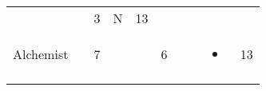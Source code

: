 \documentclass[12pt]{article}
\begin{document}
\begin{longtable}[]{@{}llllllllll@{}}
\begin{minipage}[t]{0.06\columnwidth}\raggedright\strut
\strut\end{minipage} &
\begin{minipage}[t]{0.06\columnwidth}\raggedright\strut
\strut\end{minipage} &
\begin{minipage}[t]{0.06\columnwidth}\raggedright\strut
3
\strut\end{minipage} &
\begin{minipage}[t]{0.07\columnwidth}\raggedright\strut
N
\strut\end{minipage} &
\begin{minipage}[t]{0.08\columnwidth}\raggedright\strut
13
\strut\end{minipage}\tabularnewline
\begin{minipage}[t]{0.13\columnwidth}\raggedright\strut
Alchemist
\strut\end{minipage} &
\begin{minipage}[t]{0.06\columnwidth}\raggedright\strut
\strut\end{minipage} &
\begin{minipage}[t]{0.06\columnwidth}\raggedright\strut
7
\strut\end{minipage} &
\begin{minipage}[t]{0.06\columnwidth}\raggedright\strut
\strut\end{minipage} &
\begin{minipage}[t]{0.06\columnwidth}\raggedright\strut
\strut\end{minipage} &
\begin{minipage}[t]{0.06\columnwidth}\raggedright\strut
6
\strut\end{minipage} &
\begin{minipage}[t]{0.06\columnwidth}\raggedright\strut
\strut\end{minipage} &
\begin{minipage}[t]{0.06\columnwidth}\raggedright\strut
\strut\end{minipage} &
\begin{minipage}[t]{0.07\columnwidth}\raggedright\strut
\begin{itemize}
\item
\end{itemize}
\strut\end{minipage} &
\begin{minipage}[t]{0.08\columnwidth}\raggedright\strut
13
\strut\end{minipage}\tabularnewline
\begin{minipage}[t]{0.13\columnwidth}\raggedright\strut

\end{minipage}
\end{longtable}
\end{document}
